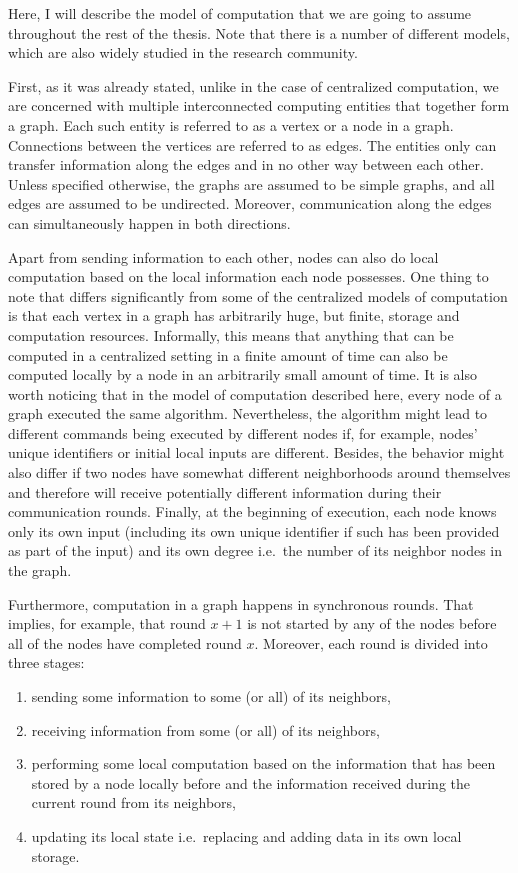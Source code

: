 Here, I will describe the model of computation that we are going to
assume throughout the rest of the thesis. Note that there is a number
of different models, which are also widely studied in the research
community.

First, as it was already stated, unlike in the case of centralized
computation, we are concerned with multiple interconnected computing entities
that together form a graph. Each such entity is referred to as a vertex or
a node in a graph. Connections between the vertices are referred to as edges.
The entities only can transfer information along the edges and in no other way
between each other. Unless specified otherwise, the graphs are assumed to be
simple graphs, and all edges are assumed to be undirected. Moreover,
communication along the edges can simultaneously happen in both directions.

Apart from sending information to each other, nodes can also
do local computation based on the local information each node possesses. One thing
to note that differs significantly from some of the centralized models of computation
is that each vertex in a graph has arbitrarily huge, but finite, storage and computation resources.
Informally, this means that anything that can be computed in a centralized setting
in a finite amount of time
can also be computed locally by a node in an arbitrarily small amount of time.
It is also worth noticing that in the model of computation described here,
every node of a graph executed the same algorithm. Nevertheless, the
algorithm might lead to different commands being executed by different nodes
if, for example, nodes' unique identifiers or initial local inputs are different.
Besides, the behavior might also differ if two nodes have somewhat different neighborhoods
around themselves and therefore will receive potentially different
information during their communication rounds. Finally, at the beginning of
execution, each node knows only its own input (including its own unique identifier
if such has been provided as part of the input) and its own degree i.e.\ the number of
its neighbor nodes in the graph.

Furthermore, computation in a graph happens in synchronous rounds. That implies,
for example, that round $x+1$ is not started by any of the nodes before all of the
nodes have completed round $x$. Moreover, each round is divided into three stages:

\begin{enumerate}
\item sending some information to some (or all) of its neighbors,

\item receiving information
from some (or all) of its neighbors,

\item performing some local computation based
on the information that has been stored by a node locally before and the information
received during the current round from its neighbors,

\item updating its local state i.e.\ replacing and adding data in its own local storage.
\end{enumerate}

